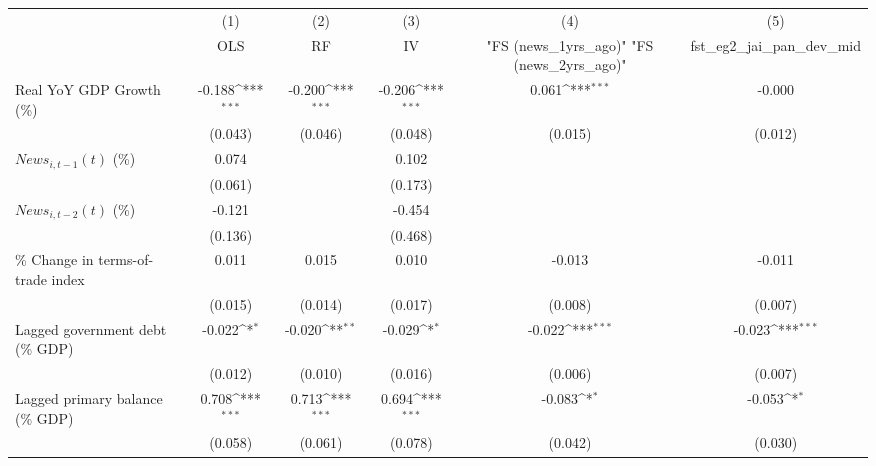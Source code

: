 {
\def\sym#1{\ifmmode^{#1}\else\(^{#1}\)\fi}
\begin{tabular}{l*{5}{c}}
\toprule
                    &\multicolumn{1}{c}{(1)}&\multicolumn{1}{c}{(2)}&\multicolumn{1}{c}{(3)}&\multicolumn{1}{c}{(4)}&\multicolumn{1}{c}{(5)}\\
                    &\multicolumn{1}{c}{OLS}&\multicolumn{1}{c}{RF}&\multicolumn{1}{c}{IV}&\multicolumn{1}{c}{ "FS (news_1yrs_ago)"  "FS (news_2yrs_ago)" }&\multicolumn{1}{c}{fst_eg2_jai_pan_dev_mid}\\
\midrule
Real YoY GDP Growth (\%)&      -0.188\sym{***}&      -0.200\sym{***}&      -0.206\sym{***}&       0.061\sym{***}&      -0.000         \\
                    &     (0.043)         &     (0.046)         &     (0.048)         &     (0.015)         &     (0.012)         \\
\addlinespace
$ News_{i,t-1}(t)$ (\%)&       0.074         &                     &       0.102         &                     &                     \\
                    &     (0.061)         &                     &     (0.173)         &                     &                     \\
\addlinespace
$ News_{i,t-2}(t)$ (\%)&      -0.121         &                     &      -0.454         &                     &                     \\
                    &     (0.136)         &                     &     (0.468)         &                     &                     \\
\addlinespace
\% Change in terms-of-trade index&       0.011         &       0.015         &       0.010         &      -0.013         &      -0.011         \\
                    &     (0.015)         &     (0.014)         &     (0.017)         &     (0.008)         &     (0.007)         \\
\addlinespace
Lagged government debt (\% GDP)&      -0.022\sym{*}  &      -0.020\sym{**} &      -0.029\sym{*}  &      -0.022\sym{***}&      -0.023\sym{***}\\
                    &     (0.012)         &     (0.010)         &     (0.016)         &     (0.006)         &     (0.007)         \\
\addlinespace
Lagged primary balance (\% GDP)&       0.708\sym{***}&       0.713\sym{***}&       0.694\sym{***}&      -0.083\sym{*}  &      -0.053\sym{*}  \\
                    &     (0.058)         &     (0.061)         &     (0.078)         &     (0.042)         &     (0.030)         \\

\end{tabular}}
